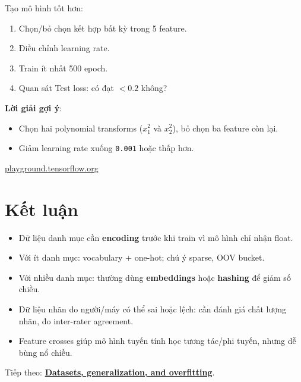 \documentclass[12pt,a4paper]{article}
\begin{document}
\begin{phuongphap}[title={Task 2}]
Tạo mô hình tốt hơn:
\begin{enumerate}
  \item Chọn/bỏ chọn kết hợp bất kỳ trong 5 feature.
  \item Điều chỉnh learning rate.
  \item Train ít nhất 500 epoch.
  \item Quan sát Test loss: có đạt \(<0.2\) không?
\end{enumerate}
\textbf{Lời giải gợi ý}:
\begin{itemize}
  \item Chọn hai polynomial transforms (\(x_1^2\) và \(x_2^2\)), bỏ chọn ba feature còn lại.
  \item Giảm learning rate xuống \texttt{0.001} hoặc thấp hơn.
\end{itemize}
\end{phuongphap}

\begin{ungdung}[title={Tìm hiểu thêm}]
\href{https://playground.tensorflow.org}{playground.tensorflow.org}
\end{ungdung}

\section{Kết luận}

\begin{tongket}
\begin{itemize}
  \item Dữ liệu danh mục cần \textbf{encoding} trước khi train vì mô hình chỉ nhận float.
  \item Với ít danh mục: vocabulary + one-hot; chú ý sparse, OOV bucket.
  \item Với nhiều danh mục: thường dùng \textbf{embeddings} hoặc \textbf{hashing} để giảm số chiều.
  \item Dữ liệu nhãn do người/máy có thể sai hoặc lệch: cần đánh giá chất lượng nhãn, đo inter-rater agreement.
  \item Feature crosses giúp mô hình tuyến tính học tương tác/phi tuyến, nhưng dễ bùng nổ chiều.
\end{itemize}
Tiếp theo: \href{https://developers.google.com/machine-learning/crash-course/overfitting}{\textbf{Datasets, generalization, and overfitting}}.
\end{tongket}
\end{document}
